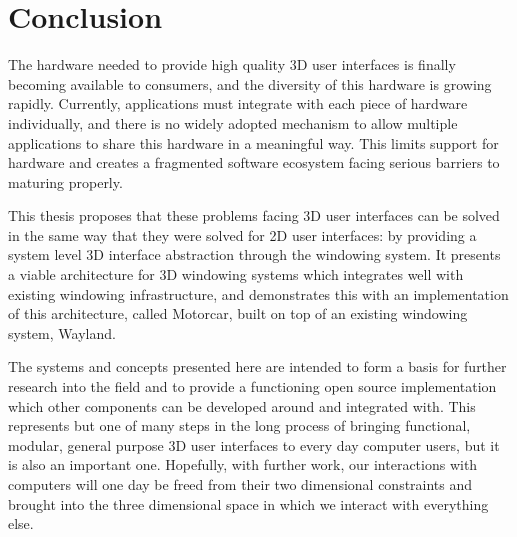 \chapter{Conclusion}

The hardware needed to provide high quality 3D user interfaces is finally becoming available to consumers, and  the diversity of this hardware is growing rapidly. Currently, applications must integrate with each piece of hardware individually, and there is no widely adopted mechanism to allow multiple applications to share this hardware in a meaningful way. This limits support for hardware and creates a fragmented software ecosystem facing serious barriers to maturing properly.

This thesis proposes that these problems facing 3D user interfaces can be solved in the same way that they were solved for 2D user interfaces: by providing a system level 3D interface abstraction through the windowing system. It presents a viable architecture for 3D windowing systems which integrates well with existing windowing infrastructure, and demonstrates this with an implementation of this architecture, called Motorcar, built on top of an existing windowing system, Wayland. 

The systems and concepts presented here are intended to form a basis for further research into the field and to provide a functioning open source implementation which other components can be developed around and integrated with. This represents but one of many steps in the long process of bringing functional, modular, general purpose 3D user interfaces to every day computer users,  but it is also an important one. Hopefully, with further work, our interactions with computers will one day be freed from their two dimensional constraints and brought into the three dimensional space in which we interact with everything else.

